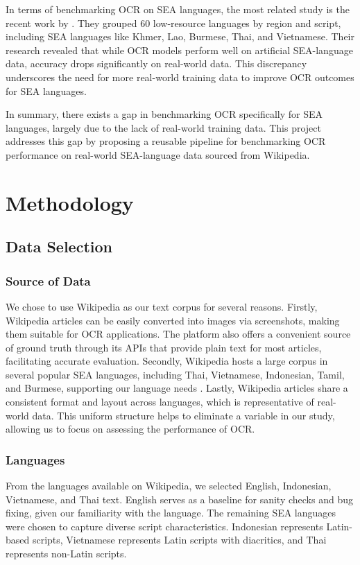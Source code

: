 \documentclass[12pt,oneside]{memoir}
\begin{document}
In terms of benchmarking OCR on SEA languages, the most related study is the recent work by \textcite{ignat-etal-2022}.
They grouped 60 low-resource languages by region and script, including SEA languages like Khmer, Lao, Burmese, Thai, and Vietnamese.
Their research revealed that while OCR models perform well on artificial SEA-language data, accuracy drops significantly on real-world data.
This discrepancy underscores the need for more real-world training data to improve OCR outcomes for SEA languages.

In summary, there exists a gap in benchmarking OCR specifically for SEA languages, largely due to the lack of real-world training data.
This project addresses this gap by proposing a reusable pipeline for benchmarking OCR performance on real-world SEA-language data sourced from Wikipedia.

\chapter{Methodology}

\section{Data Selection}

\subsection{Source of Data}
We chose to use Wikipedia as our text corpus for several reasons.
Firstly, Wikipedia articles can be easily converted into images via screenshots, making them suitable for OCR applications. 
The platform also offers a convenient source of ground truth through its APIs that provide plain text for most articles, facilitating accurate evaluation. 
Secondly, Wikipedia hosts a large corpus in several popular SEA languages, including Thai, Vietnamese, Indonesian, Tamil, and Burmese, supporting our language needs \parencite{list-of-wikipedias-2024}. 
Lastly, Wikipedia articles share a consistent format and layout across languages, which is representative of real-world data. 
This uniform structure helps to eliminate a variable in our study, allowing us to focus on assessing the performance of OCR.

\subsection{Languages}
From the languages available on Wikipedia, we selected English, Indonesian, Vietnamese, and Thai text. 
English serves as a baseline for sanity checks and bug fixing, given our familiarity with the language. 
The remaining SEA languages were chosen to capture diverse script characteristics. 
Indonesian represents Latin-based scripts, Vietnamese represents Latin scripts with diacritics, and Thai represents non-Latin scripts. 
\end{document}
